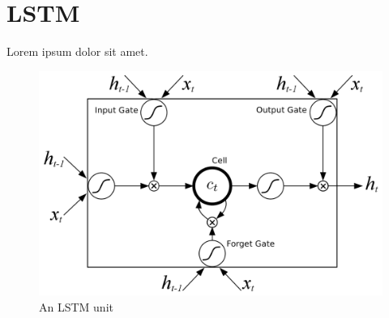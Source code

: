 \section{LSTM}
Lorem ipsum dolor sit amet.

\begin{figure}[h]
	\centering
	\includegraphics[width=0.9 \textwidth]{assets/lstm.png}
	\caption{An LSTM unit}
	\label{fig:lstm}
\end{figure}
